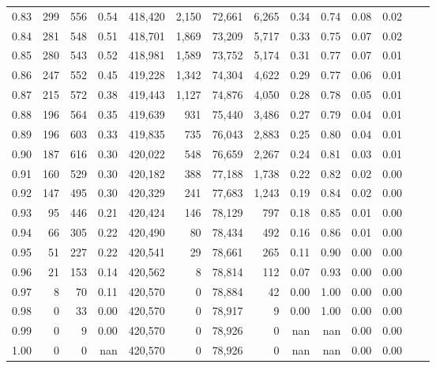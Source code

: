 \begin{tabular}{rrrrrrrrrrrrrr}
0.83 &     299 &    556 &    0.54 &  418,420 &    2,150 &  72,661 &   6,265 &  0.34 &  0.74 &  0.08 &      0.02 \\
0.84 &     281 &    548 &    0.51 &  418,701 &    1,869 &  73,209 &   5,717 &  0.33 &  0.75 &  0.07 &      0.02 \\
0.85 &     280 &    543 &    0.52 &  418,981 &    1,589 &  73,752 &   5,174 &  0.31 &  0.77 &  0.07 &      0.01 \\
0.86 &     247 &    552 &    0.45 &  419,228 &    1,342 &  74,304 &   4,622 &  0.29 &  0.77 &  0.06 &      0.01 \\
0.87 &     215 &    572 &    0.38 &  419,443 &    1,127 &  74,876 &   4,050 &  0.28 &  0.78 &  0.05 &      0.01 \\
0.88 &     196 &    564 &    0.35 &  419,639 &      931 &  75,440 &   3,486 &  0.27 &  0.79 &  0.04 &      0.01 \\
0.89 &     196 &    603 &    0.33 &  419,835 &      735 &  76,043 &   2,883 &  0.25 &  0.80 &  0.04 &      0.01 \\
0.90 &     187 &    616 &    0.30 &  420,022 &      548 &  76,659 &   2,267 &  0.24 &  0.81 &  0.03 &      0.01 \\
0.91 &     160 &    529 &    0.30 &  420,182 &      388 &  77,188 &   1,738 &  0.22 &  0.82 &  0.02 &      0.00 \\
0.92 &     147 &    495 &    0.30 &  420,329 &      241 &  77,683 &   1,243 &  0.19 &  0.84 &  0.02 &      0.00 \\
0.93 &      95 &    446 &    0.21 &  420,424 &      146 &  78,129 &     797 &  0.18 &  0.85 &  0.01 &      0.00 \\
0.94 &      66 &    305 &    0.22 &  420,490 &       80 &  78,434 &     492 &  0.16 &  0.86 &  0.01 &      0.00 \\
0.95 &      51 &    227 &    0.22 &  420,541 &       29 &  78,661 &     265 &  0.11 &  0.90 &  0.00 &      0.00 \\
0.96 &      21 &    153 &    0.14 &  420,562 &        8 &  78,814 &     112 &  0.07 &  0.93 &  0.00 &      0.00 \\
0.97 &       8 &     70 &    0.11 &  420,570 &        0 &  78,884 &      42 &  0.00 &  1.00 &  0.00 &      0.00 \\
0.98 &       0 &     33 &    0.00 &  420,570 &        0 &  78,917 &       9 &  0.00 &  1.00 &  0.00 &      0.00 \\
0.99 &       0 &      9 &    0.00 &  420,570 &        0 &  78,926 &       0 &   nan &   nan &  0.00 &      0.00 \\
1.00 &       0 &      0 &     nan &  420,570 &        0 &  78,926 &       0 &   nan &   nan &  0.00 &      0.00 \\
\bottomrule
\end{tabular}
